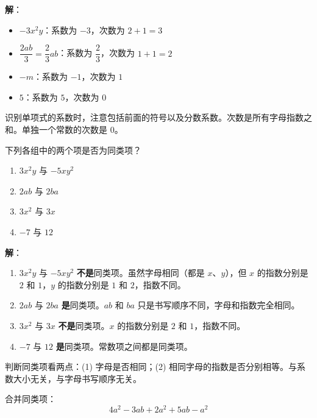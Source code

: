 \documentclass[12pt, a4paper]{ctexart}
\begin{document}
\textbf{解}：
\begin{itemize}[leftmargin=*]
  \item $-3x^2y$：系数为 $-3$，次数为 $2 + 1 = 3$
  \item $\dfrac{2ab}{3} = \dfrac{2}{3}ab$：系数为 $\dfrac{2}{3}$，次数为 $1 + 1 = 2$
  \item $-m$：系数为 $-1$，次数为 $1$
  \item $5$：系数为 $5$，次数为 $0$
\end{itemize}

\begin{tipbox}[方法总结]
识别单项式的系数时，注意包括前面的符号以及分数系数。次数是所有字母指数之和。单独一个常数的次数是 $0$。
\end{tipbox}

\vspace{6pt}

\begin{examplebox}[【例题2】判断同类项]
下列各组中的两个项是否为同类项？
\begin{enumerate}[leftmargin=*]
  \item $3x^2y$ 与 $-5xy^2$
  \item $2ab$ 与 $2ba$
  \item $3x^2$ 与 $3x$
  \item $-7$ 与 $12$
\end{enumerate}
\end{examplebox}

\textbf{解}：
\begin{enumerate}[leftmargin=*]
  \item $3x^2y$ 与 $-5xy^2$ \textbf{不是}同类项。虽然字母相同（都是 $x$、$y$），但 $x$ 的指数分别是 $2$ 和 $1$，$y$ 的指数分别是 $1$ 和 $2$，指数不同。
  \item $2ab$ 与 $2ba$ \textbf{是}同类项。$ab$ 和 $ba$ 只是书写顺序不同，字母和指数完全相同。
  \item $3x^2$ 与 $3x$ \textbf{不是}同类项。$x$ 的指数分别是 $2$ 和 $1$，指数不同。
  \item $-7$ 与 $12$ \textbf{是}同类项。常数项之间都是同类项。
\end{enumerate}

\begin{tipbox}[方法总结]
判断同类项看两点：(1) 字母是否相同；(2) 相同字母的指数是否分别相等。与系数大小无关，与字母书写顺序无关。
\end{tipbox}

\vspace{6pt}

\begin{examplebox}[【例题3】合并同类项]
合并同类项：
\[
4a^2 - 3ab + 2a^2 + 5ab - a^2
\]
\end{examplebox}
\end{document}

